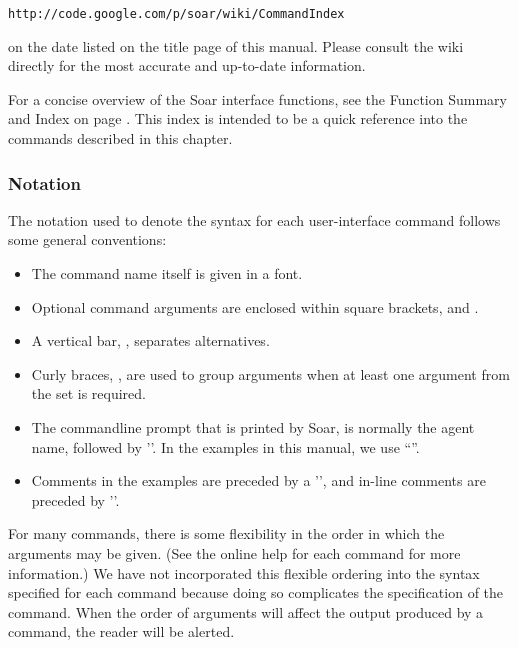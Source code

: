 \begin{verbatim}
http://code.google.com/p/soar/wiki/CommandIndex
\end{verbatim}

on the date listed on the title page of this manual.  Please consult
the wiki directly for the most accurate and up-to-date information.

For a concise overview of the Soar interface functions, see the Function
Summary and Index on page \pageref{func-sum}. This index is intended to be a
quick reference into the commands described in this chapter.

\subsubsection*{Notation}


The notation used to denote the syntax for each user-interface command follows
some general conventions:\vspace{-12pt}
\begin{itemize}
\item The command name itself is given in a  font.\vspace{-8pt}
\item Optional command arguments are enclosed within square brackets,
	\soar{[} and \soar{]}.\vspace{-8pt}
\item A vertical bar, \soar{|}, separates alternatives.\vspace{-8pt}
\item Curly braces, \soar{\{\}}, are used to group arguments when at least
one argument from the set is required.
\item The commandline prompt that is printed by Soar, is normally
the agent name, followed by '\soar{>}'.  In the examples in this manual, 
we use ``''.
\item Comments in the examples are preceded by
a '\soar{\#}', and in-line comments are preceded by '\soar{;\#}'.
\end{itemize}

For many commands, there is some flexibility in the order in which the
arguments may be given. (See the online help for each command for more
information.)  We have not incorporated this flexible ordering into the syntax
specified for each command because doing so complicates the specification of
the command.  When the order of arguments will affect the output
produced by a command, the reader will be alerted.

